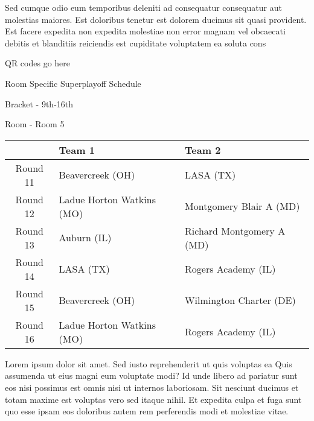 \documentclass{article}%
\begin{document}
\newline%
    Sed cumque odio eum temporibus deleniti ad consequatur consequatur aut molestias maiores. Est doloribus tenetur est dolorem ducimus sit quasi provident. Est facere expedita non expedita molestiae non error magnam vel obcaecati debitis et blanditiis reiciendis est cupiditate voluptatem ea soluta cons%
\vspace*{140pt}%
\begin{center}%
\begin{Huge}%
QR codes go here%
\end{Huge}%
\end{center}%
\newpage%
\begin{center}%
\begin{Huge}%
Room Specific Superplayoff Schedule%
\end{Huge}%
\vspace*{8pt}%
\linebreak%
\begin{Large}%
Bracket {-} 9th{-}16th%
\end{Large}%
\vspace*{8pt}%
\linebreak%
\vspace*{8pt}%
\begin{Large}%
Room {-} Room 5%
\end{Large}%
\end{center}%
%
\begin{tabularx}{\textwidth}{|c|Y|Y|}%
\hline%
&Team 1&Team 2\\%
\hline%
Round 11&Beavercreek (OH)&LASA (TX)\\%
Round 12&Ladue Horton Watkins (MO)&Montgomery Blair A (MD)\\%
Round 13&Auburn (IL)&Richard Montgomery A (MD)\\%
Round 14&LASA (TX)&Rogers Academy (IL)\\%
Round 15&Beavercreek (OH)&Wilmington Charter (DE)\\%
Round 16&Ladue Horton Watkins (MO)&Rogers Academy (IL)\\%
\hline%
\end{tabularx}%
\vspace*{8pt}%
\newline%
    Lorem ipsum dolor sit amet. Sed iusto reprehenderit ut quis voluptas ea Quis assumenda ut eius magni eum voluptate modi? Id unde libero ad pariatur sunt eos nisi possimus est omnis nisi ut internos laboriosam. Sit nesciunt ducimus et totam maxime est voluptas vero sed itaque nihil. Et expedita culpa et fuga sunt quo esse ipsam eos doloribus autem rem perferendis modi et molestiae vitae.\newline%
\end{document}
